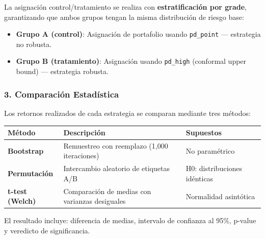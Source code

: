 \documentclass[
  spanish,
  11pt,
  letterpaper,
]{scrbook}
\newcounter{none} %
\providecommand{\tightlist}{%
  \setlength{\itemsep}{0pt}\setlength{\parskip}{0pt}}
\theoremstyle{plain}
\theoremstyle{remark}
\begin{document}
La asignación control/tratamiento se realiza con \textbf{estratificación
por grade}, garantizando que ambos grupos tengan la misma distribución
de riesgo base:

\begin{itemize}
\tightlist
\item
  \textbf{Grupo A (control)}: Asignación de portafolio usando
  \texttt{pd\_point} --- estrategia no robusta.
\item
  \textbf{Grupo B (tratamiento)}: Asignación usando \texttt{pd\_high}
  (conformal upper bound) --- estrategia robusta.
\end{itemize}

\subsubsection{3. Comparación
Estadística}\label{comparaciuxf3n-estaduxedstica}

Los retornos realizados de cada estrategia se comparan mediante tres
métodos:

{\def\LTcaptype{none} %
\begin{longtable}[]{@{}
  >{\raggedright\arraybackslash}p{}
  >{\raggedright\arraybackslash}p{}
  >{\raggedright\arraybackslash}p{}@{}}
\toprule\noalign{}
\begin{minipage}[b]{\linewidth}\raggedright
Método
\end{minipage} & \begin{minipage}[b]{\linewidth}\raggedright
Descripción
\end{minipage} & \begin{minipage}[b]{\linewidth}\raggedright
Supuestos
\end{minipage} \\
\midrule\noalign{}
\endhead
\bottomrule\noalign{}
\endlastfoot
\textbf{Bootstrap} & Remuestreo con reemplazo (1,000 iteraciones) & No
paramétrico \\
\textbf{Permutación} & Intercambio aleatorio de etiquetas A/B & H0:
distribuciones idénticas \\
\textbf{t-test (Welch)} & Comparación de medias con varianzas desiguales
& Normalidad asintótica \\
\end{longtable}
}

El resultado incluye: diferencia de medias, intervalo de confianza al
95\%, p-value y veredicto de significancia.
\end{document}

